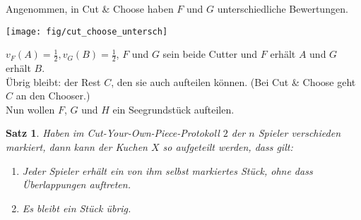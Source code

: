 \documentclass[a4paper,10pt]{scrartcl}
\newtheorem*{satz*}{Satz}
\begin{document}
Angenommen, in Cut \& Choose haben $F$ und $G$ unterschiedliche Bewertungen.\\
 \begin{center}
  \texttt{[image: fig/cut\_choose\_untersch]}
 \end{center}
$v_F(A)=\frac{1}{2}, v_G(B)=\frac{1}{2}$, $F$ und $G$ sein beide Cutter und $F$ erhält $A$ und $G$ erhält $B$.\\
Übrig bleibt: der Rest $C$, den sie auch aufteilen können. (Bei Cut \& Choose geht $C$ an den Chooser.)\\
Nun wollen $F$, $G$ und $H$ ein Seegrundstück aufteilen.



\begin{satz*}
 Haben im Cut-Your-Own-Piece-Protokoll $2$ der $n$ Spieler verschieden markiert, dann kann der Kuchen $X$ so aufgeteilt werden, dass gilt:
\begin{enumerate}
 \item Jeder Spieler erhält ein von ihm selbst markiertes Stück, ohne dass Überlap\-pungen auftreten.
 \item Es bleibt ein Stück übrig.
\end{enumerate}
\end{satz*}
\end{document}
